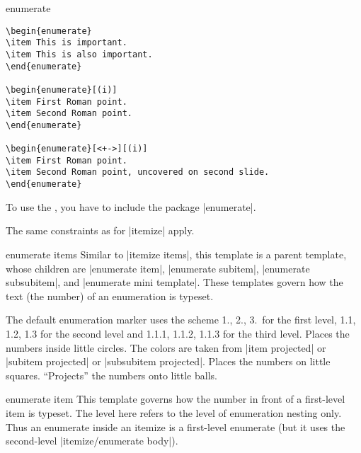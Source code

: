\begin{environment}{{enumerate}}
  \example
\begin{verbatim}
\begin{enumerate}
\item This is important.
\item This is also important.
\end{enumerate}

\begin{enumerate}[(i)]
\item First Roman point.
\item Second Roman point.
\end{enumerate}

\begin{enumerate}[<+->][(i)]
\item First Roman point.
\item Second Roman point, uncovered on second slide.
\end{enumerate}
\end{verbatim}

  \articlenote
  To use the , you have to include the package
  |enumerate|.  

  \lyxnote
  The same constraints as for |itemize| apply.
  
  \begin{template*}{enumerate items}
    Similar to |itemize items|, this template is a parent template,
    whose children are |enumerate item|, |enumerate subitem|,
    |enumerate subsubitem|, and |enumerate mini template|. These
    templates govern how the text (the number) of an enumeration is
    typeset. 
    
    \begin{templateoptions}
      The default enumeration marker uses the scheme 1., 2., 3.\ for
      the first level, 1.1, 1.2, 1.3 for the second level and 1.1.1,
      1.1.2, 1.1.3 for the third level. 
      Places the numbers inside little circles. The colors are taken
      from |item projected| or |subitem projected| or
      |subsubitem projected|.
      Places the numbers on little squares.
      ``Projects'' the numbers onto little balls.
    \end{templateoptions}
  \end{template*}

  \begin{template}{enumerate item}
    This template governs how the number in front of a first-level
    item is typeset. The level here refers to the level of enumeration
    nesting only. Thus an enumerate inside an itemize is a first-level
    enumerate (but it uses the second-level
    |itemize/enumerate body|). 


\end{template}
\end{environment}
